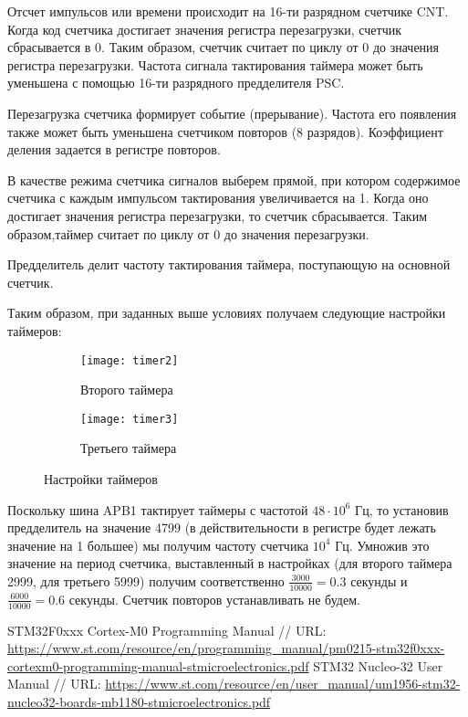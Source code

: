 Отсчет импульсов или времени происходит на 16-ти разрядном счетчике CNT. Когда код счетчика достигает значения регистра 
перезагрузки, счетчик сбрасывается в 0. Таким образом, счетчик считает по циклу от 0 до значения регистра перезагрузки.
Частота сигнала тактирования таймера может быть уменьшена с помощью 16-ти разрядного предделителя PSC.

Перезагрузка счетчика формирует событие (прерывание). Частота его появления также может быть уменьшена счетчиком повторов (8 разрядов). 
Коэффициент деления задается в регистре повторов.

В качестве режима счетчика сигналов выберем прямой, при котором  содержимое счетчика с каждым импульсом тактирования увеличивается на 1. 
Когда оно достигает значения регистра перезагрузки, то счетчик сбрасывается. Таким образом,таймер считает по циклу от 0 до значения перезагрузки. 

Предделитель делит частоту тактирования таймера, поступающую на основной счетчик.

Таким образом, при заданных выше условиях получаем следующие настройки таймеров:
\begin{figure}[H]
    \begin{subfigure}{.6\linewidth}
        \texttt{[image: timer2]}
        \caption{Второго таймера}
    \end{subfigure}
    \begin{subfigure}{.6\linewidth}
        \texttt{[image: timer3]}
        \caption{Третьего таймера}
    \end{subfigure}
    \caption{Настройки таймеров}
\end{figure}

Поскольку шина APB1 тактирует таймеры с частотой $48 \cdot 10^{6}$ Гц, то установив предделитель на значение 4799 (в 
действительности в регистре будет лежать значение на 1 большее) мы получим частоту счетчика $10^4$ Гц. Умножив это 
значение на период счетчика, выставленный в настройках (для второго таймера 2999, для третьего 5999) получим соответственно
$\frac{3000}{10000} = 0.3$ секунды и $\frac{6000}{10000} = 0.6$ секунды. Счетчик повторов устанавливать не будем.






























\begin{thebibliography}{}
STM32F0xxx Cortex-M0 Programming Manual 
// URL: \url{https://www.st.com/resource/en/programming_manual/pm0215-stm32f0xxx-cortexm0-programming-manual-stmicroelectronics.pdf}
STM32 Nucleo-32 User Manual
// URL: \url{https://www.st.com/resource/en/user_manual/um1956-stm32-nucleo32-boards-mb1180-stmicroelectronics.pdf}
\end{thebibliography}


